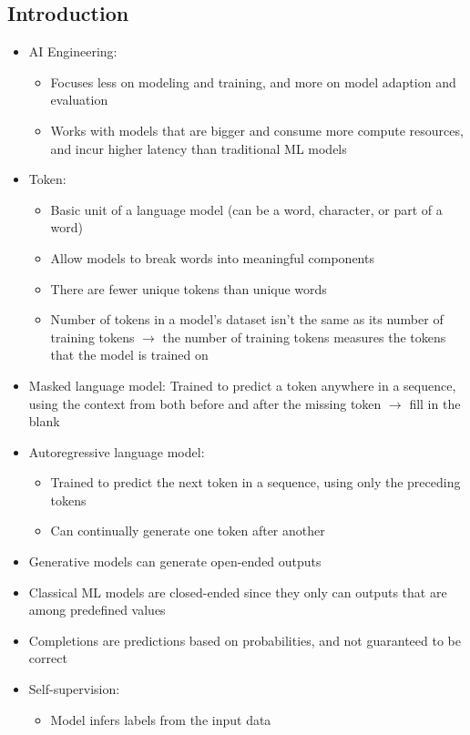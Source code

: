 \documentclass[11pt]{scrartcl}
\begin{document}
\subsection*{Introduction}
\begin{itemize}
	\item AI Engineering:
	\begin{itemize}
		\item Focuses less on modeling and training, and more on model adaption and evaluation
		\item Works with models that are bigger and consume more compute resources, and incur higher latency than traditional ML models
	\end{itemize}
	\item Token: 
	\begin{itemize}
		\item Basic unit of a language model (can be a word, character, or part of a word)
		\item Allow models to break words into meaningful components
		\item There are fewer unique tokens than unique words
		\item Number of tokens in a model's dataset isn't the same as its number of training tokens $\to$ the number of training tokens measures the tokens that the model is trained on
	\end{itemize}
	\item Masked language model: Trained to predict a token anywhere in a sequence, using the context from both before and after the missing token $\to$ fill in the blank
	\item Autoregressive language model: 
	\begin{itemize}
		\item Trained to predict the next token in a sequence, using only the preceding tokens
		\item Can continually generate one token after another
	\end{itemize}
	\item Generative models can generate open-ended outputs
	\item Classical ML models are closed-ended since they only can outputs that are among predefined values
	\item Completions are predictions based on probabilities, and not guaranteed to be correct
	\item Self-supervision:
	\begin{itemize}
		\item Model infers labels from the input data

\end{itemize}
\end{itemize}
\end{document}
